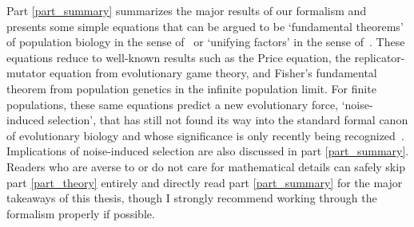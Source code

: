 Part \ref{part_summary} summarizes the major results of our formalism and presents some simple equations that can be argued to be `fundamental theorems' of population biology in the sense of~\cite{queller_fundamental_2017} or `unifying factors' in the sense of~\cite{lion_theoretical_2018}. These equations reduce to well-known results such as the Price equation, the replicator-mutator equation from evolutionary game theory, and Fisher's fundamental theorem from population genetics in the infinite population limit. For finite populations, these same equations predict a new evolutionary force, `noise-induced selection', that has still not found its way into the standard formal canon of evolutionary biology and whose significance is only recently being recognized~\citep{constable_demographic_2016,mcleod_social_2019,mazzolini_universality_2022, kuosmanen_turnover_2022}. Implications of noise-induced selection are also discussed in part \ref{part_summary}. Readers who are averse to or do not care for mathematical details can safely skip part \ref{part_theory} entirely and directly read part \ref{part_summary} for the major takeaways of this thesis, though I strongly recommend working through the formalism properly if possible.


